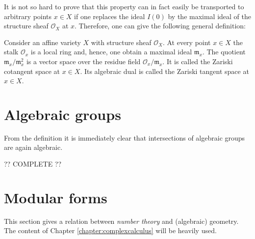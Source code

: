     It is not so hard to prove that this property can in fact easily be transported to arbitrary points $x\in X$ if one replaces the ideal $I(0)$ by the maximal ideal of the structure sheaf $\mathcal{O}_X$ at $x$. Therefore, one can give the following general definition:
    \begin{definition}
        Consider an affine variety $X$ with structure sheaf $\mathcal{O}_X$. At every point $x\in X$ the stalk $\mathcal{O}_x$ is a local ring and, hence, one obtain a maximal ideal $\mathfrak{m}_x$. The quotient $\mathfrak{m}_x/\mathfrak{m}_x^2$ is a vector space over the residue field $\mathcal{O}_x/\mathfrak{m}_x$. It is called the Zariski cotangent space at $x\in X$. Its algebraic dual is called the Zariski tangent space at $x\in X$.
    \end{definition}


\section{Algebraic groups}

    \begin{property}
        From the definition it is immediately clear that intersections of algebraic groups are again algebraic.
    \end{property}

    ?? COMPLETE ??

\section{Modular forms}

    This section gives a relation between \textit{number theory} and (algebraic) geometry. The content of Chapter \ref{chapter:complexcalculus} will be heavily used.


